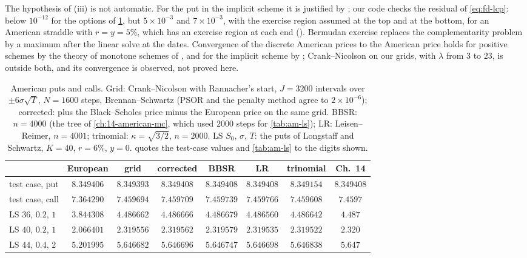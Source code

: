 The hypothesis of (iii) is not automatic. For the put in the implicit scheme it is justified
by \textcite{jaillet-lamberton-lapeyre-1990}; our code checks the residual of \eqref{eq:fd-lcp}: below
$10^{-12}$ for the options of \cref{tab:fd-american}, but $5\times10^{-3}$ and $7\times10^{-3}$, with the exercise region
assumed at the top and at the bottom, for an American straddle with $r=y=5\%$, which has an exercise region at
each end (). Bermudan exercise
replaces the complementarity problem by a maximum after the linear solve at the dates. Convergence of the discrete American prices to the American price holds
for positive schemes by the theory of monotone schemes of \textcite{barles-souganidis-1991}, and
for the implicit scheme by \textcite{jaillet-lamberton-lapeyre-1990}; Crank--Nicolson on our grids,
with $\lambda$ from $3$ to $23$, is outside both, and its convergence is observed, not proved here.

\begin{table}[ht]
\centering
\footnotesize
\setlength{\tabcolsep}{4pt}
\begin{tabular}{@{}lccccccc@{}}
\toprule
& European & grid & corrected & BBSR & LR & trinomial & Ch.~14\\
\midrule
test case, put & $8.349406$ & $8.349393$ & $8.349408$ & $8.349408$ & $8.349408$ & $8.349154$ & $8.349408$\\
test case, call & $7.364290$ & $7.459694$ & $7.459709$ & $7.459739$ & $7.459766$ & $7.459608$ & $7.4597$\\
LS $36$, $0.2$, $1$ & $3.844308$ & $4.486662$ & $4.486666$ & $4.486679$ & $4.486560$ & $4.486642$ & $4.487$\\
LS $40$, $0.2$, $1$ & $2.066401$ & $2.319556$ & $2.319562$ & $2.319579$ & $2.319535$ & $2.319522$ & $2.320$\\
LS $44$, $0.4$, $2$ & $5.201995$ & $5.646682$ & $5.646696$ & $5.646747$ & $5.646698$ & $5.646838$ & $5.647$\\
\bottomrule
\end{tabular}
\caption{American puts and calls. Grid: Crank--Nicolson with Rannacher's start, $J=3200$
  intervals over $\pm6\sigma\sqrt T$, $N=1600$ steps, Brennan--Schwartz (PSOR and the penalty method
  agree to $2\times10^{-6}$); corrected: plus the Black--Scholes price minus the European price on the
  same grid. BBSR: $n=4000$ (the tree of \cref{ch:14-american-mc}, which used $2000$ steps for
  \cref{tab:am-ls}); LR: Leisen--Reimer,
  $n=4001$; trinomial: $\kappa=\sqrt{3/2}$, $n=2000$. LS $S_0$, $\sigma$, $T$: the puts of Longstaff and
  Schwartz, $K=40$, $r=6\%$, $y=0$.  quotes the test-case values and
  \cref{tab:am-ls} to the digits shown.}
\label{tab:fd-american}
\end{table}

